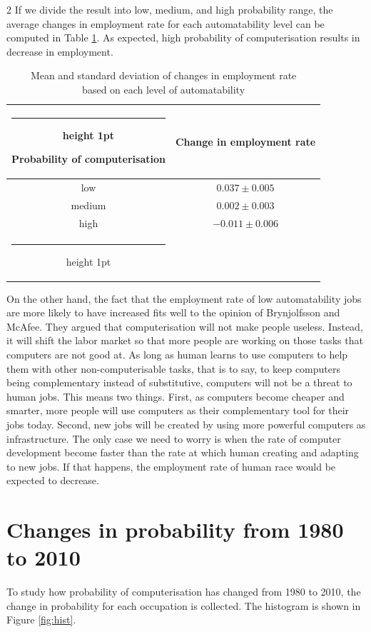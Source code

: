 \documentclass[11pt]{report}
\makeatletter
\newcommand{\thickhline}{%
    \noalign {\ifnum 0=`}\fi \hrule height 1pt
    \futurelet \reserved@a \@xhline
}
\numberwithin{equation}{chapter}
\makeatother
\begin{document}
\begin{spacing}{2}
If we divide the result into low, medium, and high probability range, the average changes in employment rate for each automatability level can be computed in Table \ref{tab:labor_change}. As expected, high probability of computerisation results in decrease in employment. 

\begin{table}
\centering
\begin{tabular}{c c}
\thickhline
Probability of computerisation & Change in employment rate \\ \hline
low                        & $0.037\pm 0.005 $                  \\
medium                     & $0.002\pm 0.003$                      \\
high                       & $-0.011\pm 0.006$                      \\ \thickhline
\end{tabular}
\centering
\caption{Mean and standard deviation of changes in employment rate \\based on each level of automatability}
\label{tab:labor_change}
\end{table} 

On the other hand, the fact that the employment rate of low automatability jobs are more likely to have increased fits well to the opinion of Brynjolfsson and McAfee\cite{brynjolfsson2012race}. They argued that computerisation will not make people useless. Instead, it will shift the labor market so that more people are working on those tasks that computers are not good at. As long as human learns to use computers to help them with other non-computerisable tasks, that is to say, to keep computers being complementary instead of substitutive, computers will not be a threat to human jobs. This means two things. First, as computers become cheaper and smarter, more people will use computers as their complementary tool for their jobs today. Second, new jobs will be created by using more powerful computers as infrastructure. The only case we need to worry is when the rate of computer development become faster than the rate at which human creating and adapting to new jobs. If that happens, the employment rate of human race would be expected to decrease.


\section{Changes in probability from 1980 to 2010}
To study how probability of computerisation has changed from 1980 to 2010, the change in probability for each occupation is collected. The histogram is shown in Figure \ref{fig:hist}. 


\end{spacing}
\end{document}
